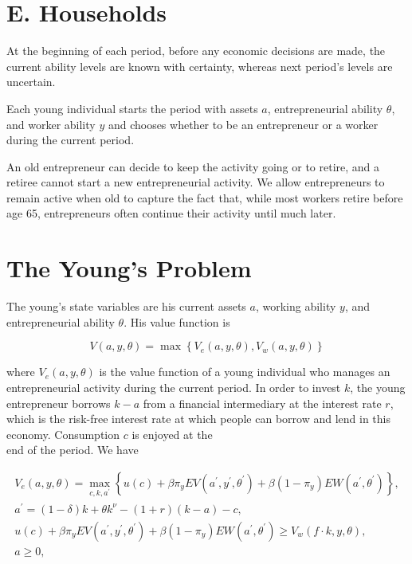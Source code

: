 \documentclass[10pt]{article}
\begin{document}
\section*{E. Households}
At the beginning of each period, before any economic decisions are made, the current ability levels are known with certainty, whereas next period's levels are uncertain.

Each young individual starts the period with assets $a$, entrepreneurial ability $\theta$, and worker ability $y$ and chooses whether to be an entrepreneur or a worker during the current period.

An old entrepreneur can decide to keep the activity going or to retire, and a retiree cannot start a new entrepreneurial activity. We allow entrepreneurs to remain active when old to capture the fact that, while most workers retire before age 65, entrepreneurs often continue their activity until much later.

\section*{The Young's Problem}
The young's state variables are his current assets $a$, working ability $y$, and entrepreneurial ability $\theta$. His value function is


\begin{equation*}
V(a, y, \theta)=\max \left\{V_{e}(a, y, \theta), V_{w}(a, y, \theta)\right\} \tag{2}
\end{equation*}


where $V_{e}(a, y, \theta)$ is the value function of a young individual who manages an entrepreneurial activity during the current period. In order to invest $k$, the young entrepreneur borrows $k-a$ from a financial intermediary at the interest rate $r$, which is the risk-free interest rate at which people can borrow and lend in this economy. Consumption $c$ is enjoyed at the\\
end of the period. We have


\begin{gather*}
V_{e}(a, y, \theta)=\max _{c, k, a^{\prime}}\left\{u(c)+\beta \pi_{y} E V\left(a^{\prime}, y^{\prime}, \theta^{\prime}\right)+\beta\left(1-\pi_{y}\right) E W\left(a^{\prime}, \theta^{\prime}\right)\right\},  \tag{3}\\
a^{\prime}=(1-\delta) k+\theta k^{\nu}-(1+r)(k-a)-c,  \tag{4}\\
u(c)+\beta \pi_{y} E V\left(a^{\prime}, y^{\prime}, \theta^{\prime}\right)+\beta\left(1-\pi_{y}\right) E W\left(a^{\prime}, \theta^{\prime}\right) \geq V_{w}(f \cdot k, y, \theta),  \tag{5}\\
a \geq 0, \tag{6}
\end{gather*}
\end{document}
